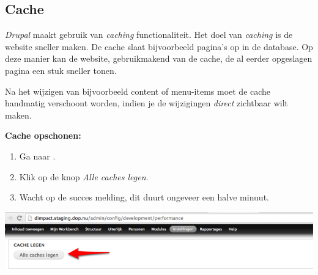 \subsection{Cache}\label{cache}
\emph{Drupal} maakt gebruik van \emph{caching} functionaliteit. Het doel van \emph{caching} is de website sneller maken. De cache slaat bijvoorbeeld pagina's op in de database. Op deze manier kan de website, gebruikmakend van de cache, de al eerder opgeslagen pagina een stuk sneller tonen. 

Na het wijzigen van bijvoorbeeld content of menu-items moet de cache handmatig verschoont worden, indien je de wijzigingen \emph{direct} zichtbaar wilt maken. 

\textbf{Cache opschonen:}

\begin{enumerate}
\item Ga naar  .
\item Klik op de knop \emph{Alle caches legen}.
\item Wacht op de succes melding, dit duurt ongeveer een halve minuut.
\end{enumerate}

\begin{center}
	\includegraphics[width=\textwidth]{img/cache.png}
\end{center}